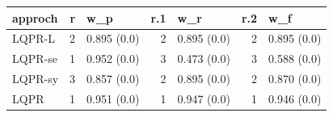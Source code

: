 \begin{tabular}{lrlrlrl}
\hline
 approch   &   r & w\_p         &   r.1 & w\_r         &   r.2 & w\_f         \\
\hline
 LQPR-L    &   2 & 0.895 (0.0) &     2 & 0.895 (0.0) &     2 & 0.895 (0.0) \\
 LQPR-se   &   1 & 0.952 (0.0) &     3 & 0.473 (0.0) &     3 & 0.588 (0.0) \\
 LQPR-sy   &   3 & 0.857 (0.0) &     2 & 0.895 (0.0) &     2 & 0.870 (0.0) \\
 LQPR      &   1 & 0.951 (0.0) &     1 & 0.947 (0.0) &     1 & 0.946 (0.0) \\
\hline
\end{tabular}